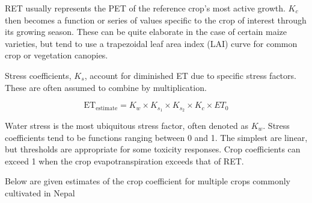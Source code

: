 \documentclass[
]{book}
\begin{document}
RET usually represents the PET of the reference crop's most active growth. \(K_c\) then becomes a function or series of values specific to the crop of interest through its growing season. These can be quite elaborate in the case of certain maize varieties, but tend to use a trapezoidal leaf area index (LAI) curve for common crop or vegetation canopies.

Stress coefficients, \(K_s\), account for diminished ET due to specific stress factors. These are often assumed to combine by multiplication.

\[
\mathrm{ET_{estimate}} = K_w \times K_{s_1} \times K_{s_2} \times K_c \times ET_0
\]

Water stress is the most ubiquitous stress factor, often denoted as \(K_w\). Stress coefficients tend to be functions ranging between 0 and 1. The simplest are linear, but thresholds are appropriate for some toxicity responses. Crop coefficients can exceed 1 when the crop evapotranspiration exceeds that of RET.

Below are given estimates of the crop coefficient for multiple crops commonly cultivated in Nepal
\end{document}
